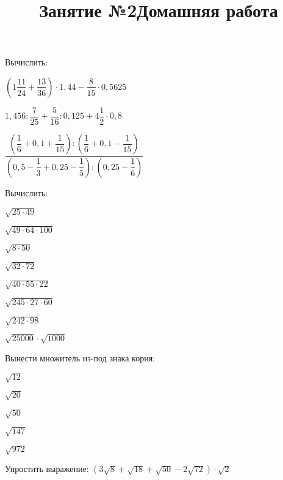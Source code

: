 \documentclass[12pt, a4paper]{article}
\begin{document}
	\title{Занятие №2}
	\begin{enumcols}[label=\textbf{\arabic*.}]
		\item Вычислить:
		\begin{enumcols}[itemcolumns=2]
			\item \( \left( 1\dfrac{11}{24}+\dfrac{13}{36} \right)\cdot1,44-\dfrac{8}{15}\cdot0,5625 \)
			\item \( 1,456:\dfrac{7}{25}+\dfrac{5}{16}:0,125+4\dfrac{1}{2}\cdot0,8 \)
			\item \( \dfrac{\left( \dfrac{1}{6}+0,1+\dfrac{1}{15} \right):\left( \dfrac{1}{6}+0,1-\dfrac{1}{15} \right)}{\left( 0,5-\dfrac{1}{3}+0,25-\dfrac{1}{5} \right):\left( 0,25-\dfrac{1}{6} \right)} \)
		\end{enumcols}
		\item Вычислить:
		\begin{enumcols}[itemcolumns=4]
			\item \( \sqrt{25\cdot49} \)
			\item \( \sqrt{49\cdot64\cdot100} \)
			\item \( \sqrt{8\cdot50} \)
			\item \( \sqrt{32\cdot72} \)
			\item \( \sqrt{40\cdot55\cdot22} \)
			\item \( \sqrt{245\cdot27\cdot60} \)
			\item \( \sqrt{242\cdot98} \)
			\item \( \sqrt{25000}\cdot\sqrt{1000} \)
		\end{enumcols}
		\item Вынести множитель из-под знака корня:
		\begin{enumcols}[itemcolumns=5]
			\item \( \sqrt{12} \)
			\item \( \sqrt{20} \)
			\item \( \sqrt{50} \)
			\item \( \sqrt{147} \)
			\item \( \sqrt{972} \)
		\end{enumcols}
		\item Упростить выражение: \( (3\sqrt{8}+\sqrt{18}+\sqrt{50}-2\sqrt{72})\cdot\sqrt{2} \)
	\end{enumcols}
	\title{Домашняя работа}
\end{document}
